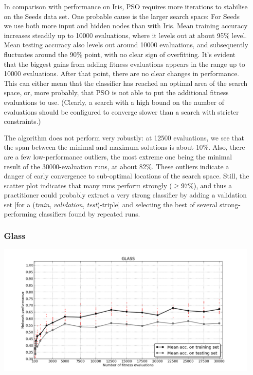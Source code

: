 \documentclass[a4paper,final,9pt]{article}
\begin{document}
\noindent
In comparison with performance on Iris, PSO requires more iterations to
stabilise on the Seeds data set. One probable cause is the larger search
space: For Seeds we use both more input and hidden nodes than with Iris. Mean
training accuracy increases steadily up to 10000 evaluations, where it levels
out at about 95\% level. Mean testing accuracy also levels out around 10000
evaluations, and subsequently fluctuates around the 90\% point, with no clear
sign of overfitting.  It's evident that the biggest gains from adding fitness
evaluations appears in the range up to 10000 evaluations. After that point,
there are no clear changes in performance. This can either mean that the
classifier has reached an optimal area of the search space, or, more probably,
that PSO is not able to put the additional fitness evaluations to use.
(Clearly, a search with a high bound on the number of evaluations should be
configured to converge slower than a search with stricter constraints.)

The algorithm does not perform
very robustly: at 12500 evaluations, we see that the span between the minimal
and maximum solutions is about 10\%. Also, there are a few low-performance
outliers, the most extreme one being the minimal result of the
30000-evaluation runs, at about 82\%. These outliers indicate a
danger of early convergence to sub-optimal locations of the search space.
Still, the scatter plot indicates that many runs perform strongly ($\geq
97\%$), and thus a practitioner could probably extract a very strong
classifier by adding a validation set [for a (\emph{train}, \emph{validation},
\emph{test})-triple] and selecting the best of several strong-performing
classifiers found by repeated runs.

\subsubsection{Glass}
\includegraphics[width=0.99\textwidth]{glass-ann-performance.png}
\end{document}
